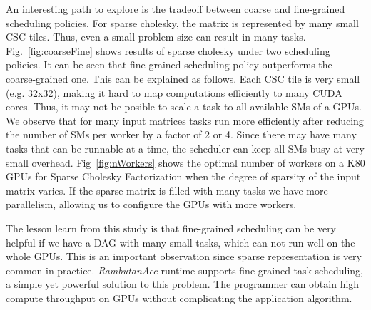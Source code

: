 An interesting path to explore is the tradeoff between coarse and fine-grained scheduling policies.  
For sparse cholesky, the matrix is represented by many small CSC tiles.
Thus, even a small problem size can result in many tasks.
Fig.~\ref{fig:coarseFine} shows results of sparse cholesky under two scheduling policies.
It can be seen that fine-grained scheduling policy outperforms the coarse-grained one.
This can be explained as follows.
Each CSC tile is very small (e.g. 32x32), making it hard to map computations efficiently to many CUDA cores.
Thus, it may not be posible to scale a task to all available SMs of a GPUs.
We observe that for many input matrices tasks run more efficiently after reducing the number of SMs per worker by a factor of 2 or 4.
Since there may have many tasks that can be runnable at a time, the scheduler can keep all SMs busy at very small overhead.
Fig~\ref{fig:nWorkers} shows the optimal number of workers on a K80 GPUs for Sparse Cholesky Factorization when the degree of sparsity of the input matrix varies.
If the sparse matrix is filled with many tasks we have more parallelism, allowing us to configure the GPUs with more workers.

The lesson learn from this study is that fine-grained scheduling can be very helpful if we have a DAG with many small tasks, which can not run well on the whole GPUs.
This is an important observation since sparse representation is very common in practice.
{\em RambutanAcc} runtime supports fine-grained task scheduling, a simple yet powerful solution to this problem.
The programmer can obtain high compute throughput on GPUs without complicating the application algorithm.

